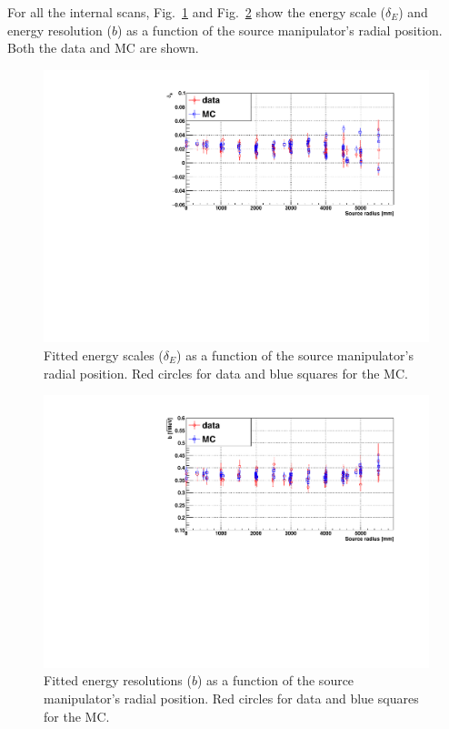 For all the internal scans, Fig.~\ref{fig:EscaleVsR} and Fig.~\ref{fig:EresolVsR} show the energy scale ($\delta_E$) and energy resolution ($b$) as a function of the source manipulator's radial position. Both the data and MC are shown.
\begin{figure}
	\centering
    \includegraphics[width=12cm]{EscaleVsSrcRadius.pdf}
	\caption[Fitted energy scales as a function of the source manipulator's radial position.]{Fitted energy scales ($\delta_E$) as a function of the source manipulator's radial position. Red circles for data and blue squares for the MC.	\label{fig:EscaleVsR}}
\end{figure}

\begin{figure}
	\centering
	\includegraphics[width=12cm]{EresolVsSrcRadius.pdf}
	\caption[Fitted energy resolutions ($b$) as a function of the source manipulator's radial position.]{Fitted energy resolutions ($b$) as a function of the source manipulator's radial position. Red circles for data and blue squares for the MC.	\label{fig:EresolVsR}}
\end{figure}

